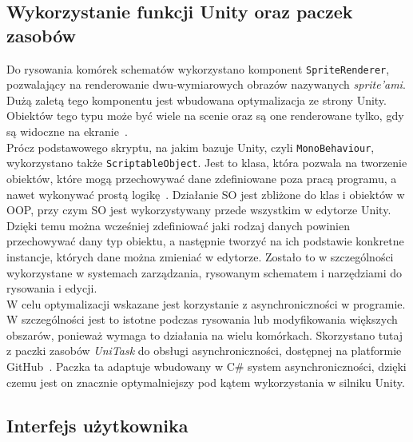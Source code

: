 \subsection{Wykorzystanie funkcji Unity oraz paczek zasobów}
\label{subsec:zasoby}

Do rysowania komórek schematów wykorzystano komponent \texttt{SpriteRenderer},
pozwalający na renderowanie dwu-wymiarowych obrazów nazywanych \textit{sprite'ami}.
Dużą zaletą tego komponentu jest wbudowana optymalizacja ze strony Unity.
Obiektów tego typu może być wiele na scenie oraz są one renderowane tylko,
gdy są widoczne na ekranie~\cite{unity_csharp, unity_docs}. \\
\indent Prócz podstawowego skryptu, na jakim bazuje Unity, czyli \texttt{MonoBehaviour},
wykorzystano także \texttt{ScriptableObject}.
Jest to klasa, która pozwala na tworzenie obiektów, które mogą przechowywać dane zdefiniowane poza pracą programu,
a nawet wykonywać prostą logikę~\cite{unity_csharp, unity_docs}.
Działanie SO jest zbliżone do klas i obiektów w OOP,
przy czym SO jest wykorzystywany przede wszystkim w edytorze Unity.
Dzięki temu można wcześniej zdefiniować jaki rodzaj danych powinien przechowywać dany typ obiektu,
a następnie tworzyć na ich podstawie konkretne instancje, których dane można zmieniać w edytorze.
Zostało to w szczególności wykorzystane w systemach zarządzania, rysowanym schematem
i narzędziami do rysowania i edycji.\\
\indent W celu optymalizacji wskazane jest korzystanie z asynchroniczności w programie.
W szczególności jest to istotne podczas rysowania lub modyfikowania większych obszarów,
ponieważ wymaga to działania na wielu komórkach.
Skorzystano tutaj z paczki zasobów \textit{UniTask} do obsługi asynchroniczności,
dostępnej na platformie GitHub~\cite{unitask}.
Paczka ta adaptuje wbudowany w C\# system asynchroniczności,
dzięki czemu jest on znacznie optymalniejszy pod kątem wykorzystania w silniku Unity.


\subsection{Interfejs użytkownika}
\label{subsec:interfejs_uzytkownika}

